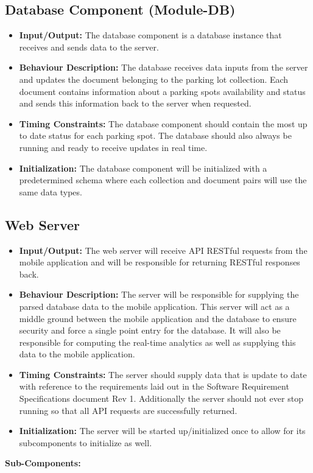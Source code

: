 \documentclass[]{article}
\begin{document}
	\subsection{Database Component (Module-DB)}
	\begin{itemize}
		\item \textbf{Input/Output:} The database component is a database instance that receives and sends data to the server.
		\item \textbf{Behaviour Description:} The database receives data inputs from the server and updates the document belonging to the parking lot collection. Each document contains information about a parking spots availability and status and sends this information back to the server when requested.
		\item \textbf{Timing Constraints:} The database component should contain the most up to date status for each parking spot. The database should also always be running and ready to receive updates in real time.
		\item \textbf{Initialization:} The database component will be initialized with a predetermined schema where each collection and document pairs will use the same data types.
	\end{itemize}
	
	\subsection{Web Server}
	\begin{itemize}
		\item \textbf{Input/Output:} The web server will receive API RESTful requests from the mobile application and will be responsible for returning RESTful responses back.
		\item \textbf{Behaviour Description:} The server will be responsible for supplying the parsed database data to the mobile application. This server will act as a middle ground between the mobile application and the database to ensure security and force a single point entry for the database. It will also be responsible for computing the real-time analytics as well as supplying this data to the mobile application.
		\item \textbf{Timing Constraints:} The server should supply data that is update to date with reference to the requirements laid out in the Software Requirement Specifications document Rev 1. Additionally the server should not ever stop running so that all API requests are successfully returned.
		\item \textbf{Initialization:} The server will be started up/initialized once to allow for its subcomponents to initialize as well.
	\end{itemize}
	\textbf{Sub-Components:}
	
\end{document}
